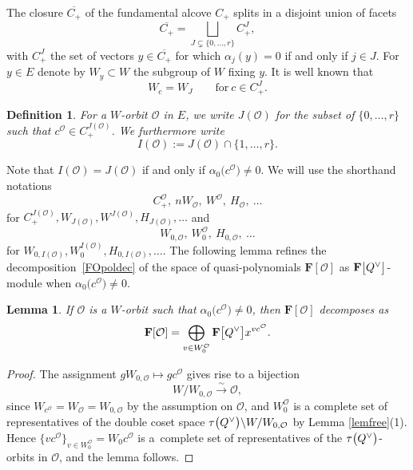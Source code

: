 \documentclass[pdftex]{sigma}
\numberwithin{equation}{section}
\newtheorem{Lemma}[Theorem]{Lemma}
\newtheorem{Definition}[Theorem]{Definition}
\begin{document}
The closure $\overline{C_+}$ of the fundamental alcove $C_+$ splits in a disjoint union of facets
\begin{equation*}%
\overline{C_+}=\bigsqcup_{J\subsetneq \{0,\dots,r\}}C_+^J,
\end{equation*}
with $C_+^J$ the set of vectors $y\in\overline{C_+}$ for which $\alpha_j(y)=0$ if and only if $j\in J$.
For $y\in E$ denote by $W_y\subset W$ the subgroup of $W$ fixing $y$. It is well known that
\[
W_c=W_J\qquad \text{for}\ c\in C_+^J.
\]

\begin{Definition}\label{IJ}
For a $W$-orbit $\mathcal{O}$ in $E$, we write
$J(\mathcal{O})$ for the subset of $\{0,\dots,r\}$ such that $c^\mathcal{O}\in C_+^{J(\mathcal{O})}$. We furthermore write
\begin{equation*}%
I(\mathcal{O}):=J(\mathcal{O})\cap\{1,\dots,r\}.
\end{equation*}
\end{Definition}

Note that $I(\mathcal{O})=J(\mathcal{O})$ if and only if $\alpha_0\bigl(c^\mathcal{O}\bigr)\not=0$.
We will use the shorthand notations
\[
C_+^\mathcal{O},\ nW_\mathcal{O},\ W^\mathcal{O},\ H_\mathcal{O}, \ \dots
\]
for $C_+^{J(\mathcal{O})},W_{J(\mathcal{O})}, W^{J(\mathcal{O})}, H_{J(\mathcal{O})},\dots$ and
\[
W_{0,\mathcal{O}},\ W^{\mathcal{O}}_0,\ H_{0,\mathcal{O}},\ \dots
\]
for $W_{0,I(\mathcal{O})}, W_0^{I(\mathcal{O})}, H_{0,I(\mathcal{O})},\dots$.
The following lemma refines the decomposition~\eqref{FOpoldec} of the space of quasi-polynomials $\mathbf{F}[\mathcal{O}]$ as $\mathbf{F}\smash{\bigl[Q^\vee\bigr]}$-module when
$\alpha_0\bigl(c^\mathcal{O}\bigr)\not=0$.
\begin{Lemma}\label{Pcpoldec}
If $\mathcal{O}$ is a $W$-orbit such that $\alpha_0\bigl(c^\mathcal{O}\bigr)\not=0$, then
$\mathbf{F}[\mathcal{O}]$ decomposes as
\begin{equation}\label{FpoldecI}
\mathbf{F}[\mathcal{O}]=\bigoplus_{v\in W_0^\mathcal{O}}\mathbf{F}\smash{\bigl[Q^\vee\bigr]}x^{vc^\mathcal{O}}.
\end{equation}
\end{Lemma}
\begin{proof}
The assignment $gW_{0,\mathcal{O}}\mapsto gc^\mathcal{O}$ gives rise to a bijection
\[
W/W_{0,\mathcal{O}}\overset{\sim}{\longrightarrow}\mathcal{O},
\]
since $W_{c^\mathcal{O}}=W_{\mathcal{O}}=W_{0,\mathcal{O}}$ by the assumption on $\mathcal{O}$, and $W_0^{\mathcal{O}}$ is a complete set of representatives of the double coset space $\tau\smash{\bigl(Q^\vee\bigr)}\backslash W/W_{0,\mathcal{O}}$ by Lemma
\ref{lemfree}(1).
Hence $\{vc^\mathcal{O}\}_{v\in W_0^{\mathcal{O}}}=W_0c^\mathcal{O}$ is a~complete set of representatives of the $\tau\smash{\bigl(Q^\vee\bigr)}$-orbits in $\mathcal{O}$, and the lemma follows.
\end{proof}
\end{document}
